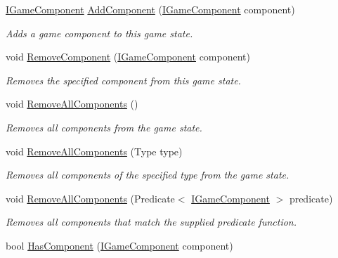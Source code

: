 \begin{DoxyCompactItemize}
\hyperlink{interface_tri_devs_1_1_tri_engine_1_1_interfaces_1_1_i_game_component}{I\-Game\-Component} \hyperlink{class_tri_devs_1_1_tri_engine_1_1_state_management_1_1_game_state_a049030ba4147caccbdc953712491f1f7}{Add\-Component} (\hyperlink{interface_tri_devs_1_1_tri_engine_1_1_interfaces_1_1_i_game_component}{I\-Game\-Component} component)
\begin{DoxyCompactList}\small\item\em Adds a game component to this game state. \end{DoxyCompactList}\item 
void \hyperlink{class_tri_devs_1_1_tri_engine_1_1_state_management_1_1_game_state_ac4200ff73fcfdcb50dee4b289b79ae01}{Remove\-Component} (\hyperlink{interface_tri_devs_1_1_tri_engine_1_1_interfaces_1_1_i_game_component}{I\-Game\-Component} component)
\begin{DoxyCompactList}\small\item\em Removes the specified component from this game state. \end{DoxyCompactList}\item 
void \hyperlink{class_tri_devs_1_1_tri_engine_1_1_state_management_1_1_game_state_a40a09d6a66a68e430dbaa194c40a2dc9}{Remove\-All\-Components} ()
\begin{DoxyCompactList}\small\item\em Removes all components from the game state. \end{DoxyCompactList}\item 
void \hyperlink{class_tri_devs_1_1_tri_engine_1_1_state_management_1_1_game_state_ad133ecae349938a72ac60dca92cd7f2d}{Remove\-All\-Components} (Type type)
\begin{DoxyCompactList}\small\item\em Removes all components of the specified type from the game state. \end{DoxyCompactList}\item 
void \hyperlink{class_tri_devs_1_1_tri_engine_1_1_state_management_1_1_game_state_a2d0ee4c6fadfa3810384a0b14557fe36}{Remove\-All\-Components} (Predicate$<$ \hyperlink{interface_tri_devs_1_1_tri_engine_1_1_interfaces_1_1_i_game_component}{I\-Game\-Component} $>$ predicate)
\begin{DoxyCompactList}\small\item\em Removes all components that match the supplied predicate function. \end{DoxyCompactList}\item 
bool \hyperlink{class_tri_devs_1_1_tri_engine_1_1_state_management_1_1_game_state_ac1f8a8a54430d2144ee918600d4a532f}{Has\-Component} (\hyperlink{interface_tri_devs_1_1_tri_engine_1_1_interfaces_1_1_i_game_component}{I\-Game\-Component} component)

\end{DoxyCompactItemize}
